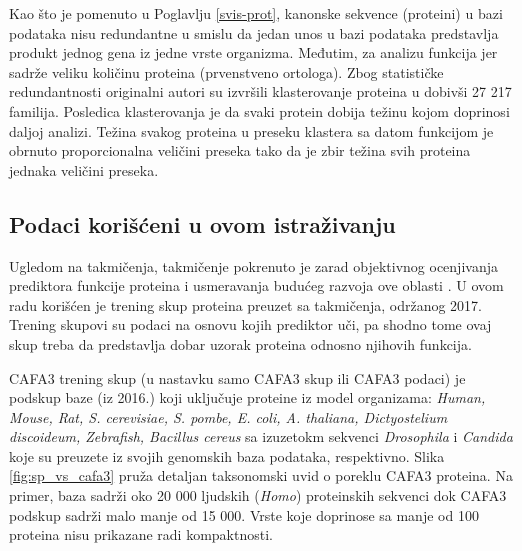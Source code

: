 Kao što je pomenuto u Poglavlju \ref{svis-prot}, kanonske sekvence (proteini) u \swissprot
bazi podataka nisu redundantne u smislu da jedan unos u bazi podataka predstavlja produkt
jednog gena iz jedne vrste organizma. Međutim, za analizu funkcija
\swissprot {} \parencite{Xie2007} jer
sadrže veliku količinu  proteina (prvenstveno ortologa).
Zbog statističke redundantnosti originalni autori su izvršili klasterovanje \swissprot
proteina u  dobivši 27 217 familija. Posledica
klasterovanja je da svaki protein dobija težinu kojom doprinosi daljoj analizi.
Težina svakog proteina u preseku klastera sa datom funkcijom je obrnuto
proporcionalna veličini preseka tako da je zbir težina svih proteina jednaka
veličini preseka.

%

\subsection{Podaci korišćeni u ovom istraživanju}

Ugledom na  takmičenja,   takmičenje pokrenuto je zarad objektivnog ocenjivanja
prediktora funkcije proteina i usmeravanja budućeg razvoja ove oblasti
\parencite{CAFA}.  U ovom radu korišćen je trening skup proteina preuzet sa
 takmičenja, održanog 2017. Trening skupovi su podaci na osnovu
kojih prediktor uči, pa shodno tome ovaj skup treba da predstavlja dobar uzorak
proteina odnosno njihovih funkcija.

CAFA3 trening skup (u nastavku samo CAFA3 skup ili CAFA3 podaci) je podskup \swissprot baze (iz 2016.) koji
uključuje proteine iz model organizama: \textit{Human, Mouse, Rat, S.
cerevisiae, S. pombe, E. coli, A. thaliana, Dictyostelium discoideum,
Zebrafish, Bacillus cereus} sa izuzetokm sekvenci \textit{Drosophila} i \textit{Candida}
koje su preuzete iz svojih genomskih baza podataka, respektivno.
Slika \ref{fig:sp_vs_cafa3} pruža detaljan taksonomski uvid o poreklu CAFA3 proteina.
Na primer, \swissprot baza sadrži oko 20 000 ljudskih (\textit{Homo})
proteinskih sekvenci dok CAFA3 podskup sadrži malo manje od 15 000.  Vrste
koje doprinose sa manje od 100 proteina nisu prikazane radi kompaktnosti.

